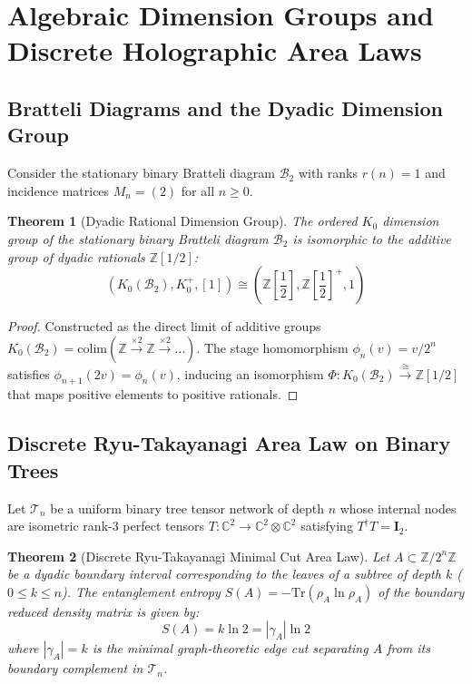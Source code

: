 \documentclass[11pt,reqno]{article}
\theoremstyle{plain}
\newtheorem{theorem}{Theorem}[section]
\theoremstyle{definition}
\theoremstyle{remark}
\newcommand{\Z}{\mathbb{Z}}
\newcommand{\C}{\mathbb{C}}
\newcommand{\Tr}{\mathrm{Tr}}
\begin{document}
\section{Algebraic Dimension Groups and Discrete Holographic Area Laws}

\subsection{Bratteli Diagrams and the Dyadic Dimension Group}

Consider the stationary binary Bratteli diagram $\mathcal{B}_2$ with ranks $r(n) = 1$ and incidence matrices $M_n = (2)$ for all $n \ge 0$.

\begin{theorem}[Dyadic Rational Dimension Group]
\label{thm:dimension_group}
The ordered $K_0$ dimension group of the stationary binary Bratteli diagram $\mathcal{B}_2$ is isomorphic to the additive group of dyadic rationals $\Z[1/2]$:
\[
\left( K_0(\mathcal{B}_2), K_0^+, [1] \right) \cong \left( \Z\left[\frac{1}{2}\right], \Z\left[\frac{1}{2}\right]^+, 1 \right)
\]
\end{theorem}

\begin{proof}
Constructed as the direct limit of additive groups $K_0(\mathcal{B}_2) = \mathrm{colim}(\Z \xrightarrow{\times 2} \Z \xrightarrow{\times 2} \dots)$. The stage homomorphism $\phi_n(v) = v / 2^n$ satisfies $\phi_{n+1}(2v) = \phi_n(v)$, inducing an isomorphism $\Phi \colon K_0(\mathcal{B}_2) \xrightarrow{\cong} \Z[1/2]$ that maps positive elements to positive rationals.
\end{proof}

\subsection{Discrete Ryu-Takayanagi Area Law on Binary Trees}

Let $\mathcal{T}_n$ be a uniform binary tree tensor network of depth $n$ whose internal nodes are isometric rank-3 perfect tensors $T \colon \C^2 \to \C^2 \otimes \C^2$ satisfying $T^\dagger T = \mathbf{I}_2$.

\begin{theorem}[Discrete Ryu-Takayanagi Minimal Cut Area Law]
\label{thm:ryu_takayanagi}
Let $A \subset \Z/2^n\Z$ be a dyadic boundary interval corresponding to the leaves of a subtree of depth $k$ ($0 \le k \le n$). The entanglement entropy $S(A) = -\Tr(\rho_A \ln \rho_A)$ of the boundary reduced density matrix is given by:
\[
S(A) = k \ln 2 = |\gamma_A| \ln 2
\]
where $|\gamma_A| = k$ is the minimal graph-theoretic edge cut separating $A$ from its boundary complement in $\mathcal{T}_n$.
\end{theorem}
\end{document}

